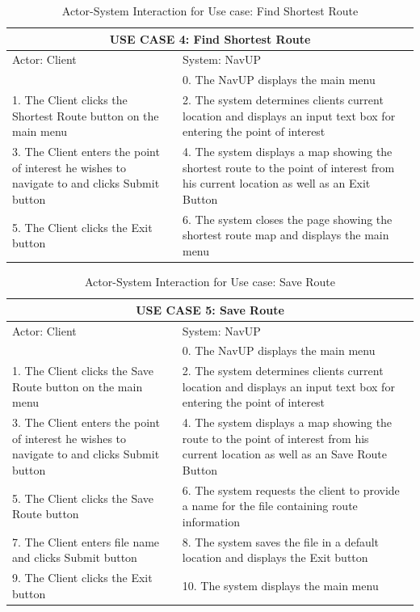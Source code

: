 \documentclass[a4paper,10pt]{article}
\begin{document}
\begin{enumerate}
 
\begin{table}[h!]
\centering
\begin {tabular}{ |p{6cm}||p{6cm}|}
\hline
\multicolumn{2}{|c|}{USE CASE 4: Find Shortest Route }\\
\hline
Actor: Client&System: NavUP\\
\hline
&0. The NavUP displays the main menu\\
1. The Client clicks the Shortest Route button on the main menu &2. The system determines clients current location and displays an input text box for entering the point of interest\\
3. The Client enters the point of interest he wishes to navigate to and clicks Submit button &4. The system displays a map showing the shortest route to the point of interest from his current location as well as an Exit Button\\
5. The Client clicks the Exit button &6. The system closes the page showing the shortest route map and displays the main menu\\
\hline
\end {tabular}
\caption{Actor-System Interaction for Use case:  Find Shortest Route} 
\end {table}

\begin{table}[h!]
\centering
\begin {tabular}{ |p{6cm}||p{6cm}|}
\hline
\multicolumn{2}{|c|}{USE CASE 5: Save Route }\\
\hline
Actor: Client&System: NavUP\\
\hline
&0. The NavUP displays the main menu\\
1. The Client clicks the Save Route button on the main menu &2. The system determines clients current location and displays an input text box for entering the point of interest\\
3. The Client enters the point of interest he wishes to navigate to and clicks Submit button &4. The system displays a map showing the route to the point of interest from his current location as well as an Save Route Button\\
5. The Client clicks the Save Route button &6. The system requests the client to provide a name for the file containing route information\\
7. The Client enters file name and clicks Submit button &8. The system saves the file in a default location and displays the Exit button\\
9. The Client clicks the Exit button &10. The system displays the main menu\\
\hline
\end {tabular}
\caption{Actor-System Interaction for Use case:  Save Route} 
\end {table}


\end{enumerate}
\end{document}

